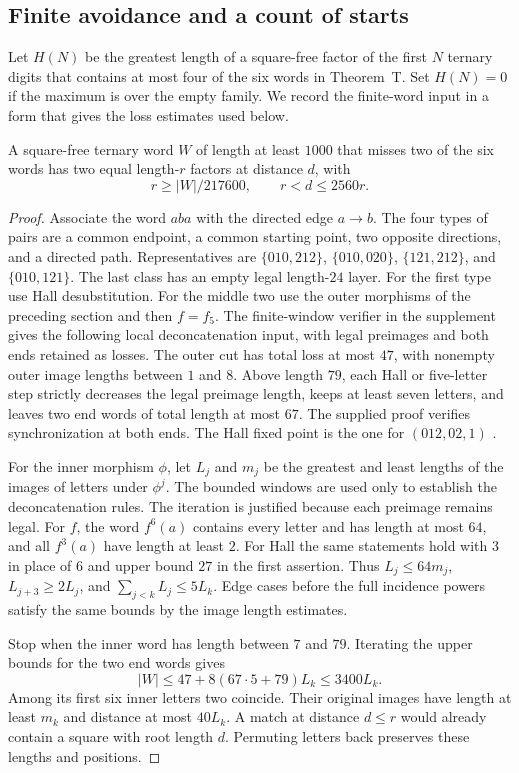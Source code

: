 \subsection{Finite avoidance and a count of starts}\label{sec:finite}
Let $H(N)$ be the greatest length of a square-free factor of the first $N$ ternary digits that contains at most four of the six words in Theorem~T. Set $H(N)=0$ if the maximum is over the empty family. We record the finite-word input in a form that gives the loss estimates used below.

\begin{lemma}\label{lem:finite}
A square-free ternary word $W$ of length at least $1000$ that misses two of the six words has two equal length-$r$ factors at distance $d$, with
\[
 r\ge |W|/217600,\qquad r<d\le2560r .
\]
\end{lemma}

\begin{proof}
Associate the word $aba$ with the directed edge $a\to b$. The four types of pairs are a common endpoint, a common starting point, two opposite directions, and a directed path. Representatives are $\{010,212\}$, $\{010,020\}$, $\{121,212\}$, and $\{010,121\}$. The last class has an empty legal length-$24$ layer. For the first type use Hall desubstitution. For the middle two use the outer morphisms of the preceding section and then $f=f_5$. The finite-window verifier in the supplement gives the following local deconcatenation input, with legal preimages and both ends retained as losses. The outer cut has total loss at most $47$, with nonempty outer image lengths between $1$ and $8$. Above length $79$, each Hall or five-letter step strictly decreases the legal preimage length, keeps at least seven letters, and leaves two end words of total length at most $67$. The supplied proof verifies synchronization at both ends. The Hall fixed point is the one for $(012,02,1)$ \cite{Hall}.

For the inner morphism $\phi$, let $L_j$ and $m_j$ be the greatest and least lengths of the images of letters under $\phi^j$. The bounded windows are used only to establish the deconcatenation rules. The iteration is justified because each preimage remains legal. For $f$, the word $f^6(a)$ contains every letter and has length at most $64$, and all $f^3(a)$ have length at least $2$. For Hall the same statements hold with $3$ in place of $6$ and upper bound $27$ in the first assertion. Thus $L_j\le64m_j$, $L_{j+3}\ge2L_j$, and $\sum_{j<k}L_j\le5L_k$. Edge cases before the full incidence powers satisfy the same bounds by the image length estimates.

Stop when the inner word has length between $7$ and $79$. Iterating the upper bounds for the two end words gives
\[
 |W|\le47+8(67\cdot5+79)L_k\le3400L_k.
\]
Among its first six inner letters two coincide. Their original images have length at least $m_k$ and distance at most $40L_k$. A match at distance $d\le r$ would already contain a square with root length $d$. Permuting letters back preserves these lengths and positions.
\end{proof}

